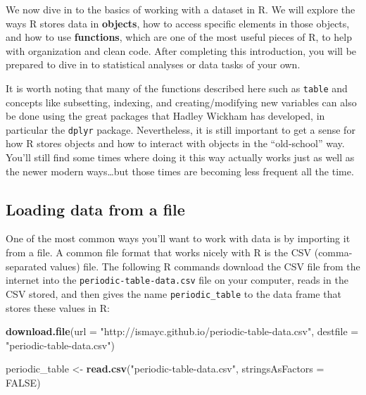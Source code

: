 \documentclass[]{tufte-book}
\newenvironment{Shaded}{\begin{snugshade}}{\end{snugshade}}
\newcommand{\AttributeTok}[1]{\textcolor[rgb]{0.13,0.29,0.53}{#1}}
\newcommand{\ConstantTok}[1]{\textcolor[rgb]{0.56,0.35,0.01}{#1}}
\newcommand{\FunctionTok}[1]{\textcolor[rgb]{0.13,0.29,0.53}{\textbf{#1}}}
\newcommand{\NormalTok}[1]{#1}
\newcommand{\OtherTok}[1]{\textcolor[rgb]{0.56,0.35,0.01}{#1}}
\newcommand{\StringTok}[1]{\textcolor[rgb]{0.31,0.60,0.02}{#1}}
\begin{document}
We now dive in to the basics of working with a dataset in R. We will explore the ways R stores data in \textbf{objects}, how to access specific elements in those objects, and how to use \textbf{functions}, which are one of the most useful pieces of R, to help with organization and clean code. After completing this introduction, you will be prepared to dive in to statistical analyses or data tasks of your own.

It is worth noting that many of the functions described here such as \texttt{table} and concepts like subsetting, indexing, and creating/modifying new variables can also be done using the great packages that Hadley Wickham has developed, in particular the \texttt{dplyr} package. Nevertheless, it is still important to get a sense for how R stores objects and how to interact with objects in the ``old-school'' way. You'll still find some times where doing it this way actually works just as well as the newer modern ways\ldots but those times are becoming less frequent all the time.

\subsection{Loading data from a file}\label{loading-data-from-a-file}

One of the most common ways you'll want to work with data is by importing it from a file. A common file format that works nicely with R is the CSV (comma-separated values) file. The following R commands download the CSV file from the internet into the \texttt{periodic-table-data.csv} file on your computer, reads in the CSV stored, and then gives the name \texttt{periodic\_table} to the data frame that stores these values in R:

\begin{Shaded}
\begin{Highlighting}[]
\FunctionTok{download.file}\NormalTok{(}\AttributeTok{url =} \StringTok{"http://ismayc.github.io/periodic{-}table{-}data.csv"}\NormalTok{,}
 \AttributeTok{destfile =} \StringTok{"periodic{-}table{-}data.csv"}\NormalTok{)}
\end{Highlighting}
\end{Shaded}

\begin{Shaded}
\begin{Highlighting}[]
\NormalTok{periodic\_table }\OtherTok{\textless{}{-}} \FunctionTok{read.csv}\NormalTok{(}\StringTok{"periodic{-}table{-}data.csv"}\NormalTok{,}
              \AttributeTok{stringsAsFactors =} \ConstantTok{FALSE}\NormalTok{)}
\end{Highlighting}
\end{Shaded}
\end{document}
